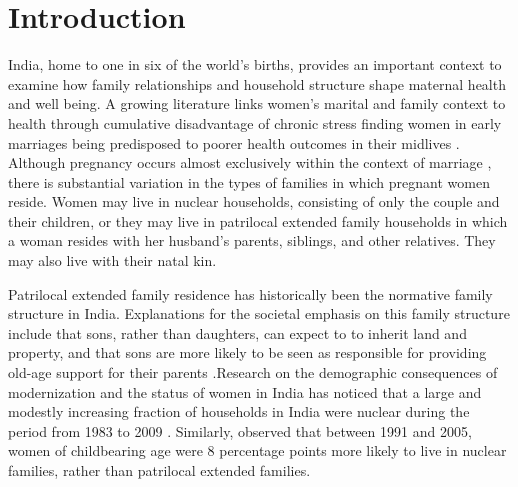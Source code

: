 \documentclass[10pt,twoside,reqno]{article}
\begin{document}
\vspace*{12pt}

\setlength{\parskip}{0ex}

\pagestyle{fancy}
\setcounter{footnote}{\autorzahl}


\section*{Introduction}\label{sec:Introduction} %

India, home to one in six of the world’s births, provides an important context to examine how family relationships and household structure shape maternal health and well being. A growing literature links women's marital and family context to health through cumulative disadvantage of chronic stress finding women in early marriages being predisposed to poorer health outcomes in their midlives \citep{vikram2021early}. Although pregnancy occurs almost exclusively within the context of marriage \citep{banerji2021does}, there is substantial variation in the types of families in which pregnant women reside. Women may live in nuclear households, consisting of only the couple and their children, or they may live in patrilocal extended family households in which a woman resides with her husband’s parents, siblings, and other relatives.  They may also live with their natal kin.

Patrilocal extended family residence has historically been the normative family structure in India.  Explanations for the societal emphasis on this family structure include that sons, rather than daughters, can expect to to inherit land and property, and that sons are more likely to be seen as responsible for providing old-age support for their parents \citep{dyson1983kinship, pande2007explaining, allendorf2020another, pandian2022rise}.Research on the demographic consequences of modernization and the status of women in India has noticed that a large and modestly increasing fraction of households in India were nuclear during the period from 1983 to 2009 \citep{breton2021modernisation}.  Similarly, \cite{allendorf2013going} observed that between 1991 and 2005, women of childbearing age were 8 percentage points more likely to live in nuclear families, rather than patrilocal extended families.
\end{document}
